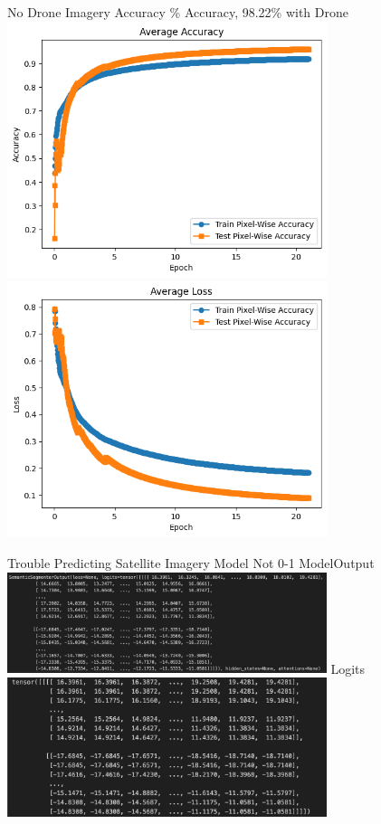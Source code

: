\begin{frame}{No Drone Imagery Accuracy}
    \% Accuracy, 98.22\% with Drone
    \includegraphics[height=0.7\textheight,width=0.7\textwidth,keepaspectratio]{mm-images/AvgAcc.png}
    \includegraphics[height=0.7\textheight,width=0.7\textwidth,keepaspectratio]{mm-images/AvgLoss.png}
\end{frame}

\begin{frame}{Trouble Predicting Satellite Imagery}
    \centering
    Model Not 0-1
    ModelOutput
    \includegraphics[height=0.7\textheight,width=0.7\textwidth,keepaspectratio]{mm-images/ModelOutput.png}
    Logits
    \includegraphics[height=0.7\textheight,width=0.7\textwidth,keepaspectratio]{mm-images/Logits.png}
\end{frame}
